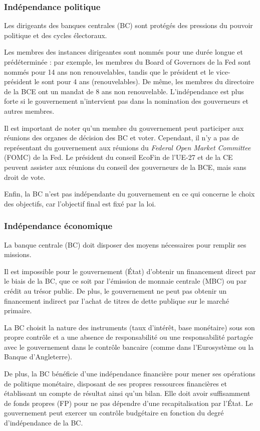 \documentclass[a4paper, 12pt]{report}
\begin{document}
\subsubsection{Indépendance politique}

Les dirigeants des banques centrales (BC) sont protégés des pressions du pouvoir politique et des cycles électoraux. 

Les membres des instances dirigeantes sont nommés pour une durée longue et prédéterminée : par exemple, les membres du Board of Governors de la Fed sont nommés pour 14 ans non renouvelables, tandis que le président et le vice-président le sont pour 4 ans (renouvelables). De même, les membres du directoire de la BCE ont un mandat de 8 ans non renouvelable. L'indépendance est plus forte si le gouvernement n'intervient pas dans la nomination des gouverneurs et autres membres. 

Il est important de noter qu'un membre du gouvernement peut participer aux réunions des organes de décision des BC et voter. Cependant, il n'y a pas de représentant du gouvernement aux réunions du \textit{Federal Open Market Committee} (FOMC) de la Fed. Le président du conseil EcoFin de l'UE-27 et de la CE peuvent assister aux réunions du conseil des gouverneurs de la BCE, mais sans droit de vote. 

Enfin, la BC n'est pas indépendante du gouvernement en ce qui concerne le choix des objectifs, car l'objectif final est fixé par la loi.

\subsubsection{Indépendance économique}

La banque centrale (BC) doit disposer des moyens nécessaires pour remplir ses missions. 

Il est impossible pour le gouvernement (État) d'obtenir un financement direct par le biais de la BC, que ce soit par l'émission de monnaie centrale (MBC) ou par crédit au trésor public. De plus, le gouvernement ne peut pas obtenir un financement indirect par l'achat de titres de dette publique sur le marché primaire. 

La BC choisit la nature des instruments (taux d'intérêt, base monétaire) sous son propre contrôle et a une absence de responsabilité ou une responsabilité partagée avec le gouvernement dans le contrôle bancaire (comme dans l'Eurosystème ou la Banque d'Angleterre). 

De plus, la BC bénéficie d'une indépendance financière pour mener ses opérations de politique monétaire, disposant de ses propres ressources financières et établissant un compte de résultat ainsi qu'un bilan. Elle doit avoir suffisamment de fonds propres (FP) pour ne pas dépendre d'une recapitalisation par l'État. Le gouvernement peut exercer un contrôle budgétaire en fonction du degré d'indépendance de la BC.
\end{document}
